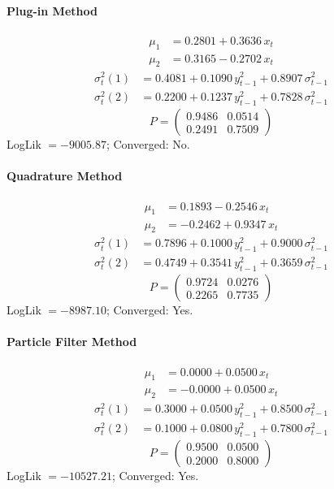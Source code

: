 \documentclass[11pt, a4paper]{article}
\begin{document}
\paragraph{Plug-in Method}
\begin{align}
\mu_{1} &= 0.2801 + 0.3636\, x_t \\
\mu_{2} &= 0.3165 -0.2702\, x_t
\end{align}
\begin{align}
\sigma^2_{t}(1) &= 0.4081 + 0.1090\, y_{t-1}^2 + 0.8907\, \sigma^2_{t-1} \\
\sigma^2_{t}(2) &= 0.2200 + 0.1237\, y_{t-1}^2 + 0.7828\, \sigma^2_{t-1}
\end{align}
\begin{equation}
P = \begin{pmatrix} 0.9486 & 0.0514 \\ 0.2491 & 0.7509 \end{pmatrix}
\end{equation}
LogLik $= -9005.87$; Converged: No.

\paragraph{Quadrature Method}
\begin{align}
\mu_{1} &= 0.1893 -0.2546\, x_t \\
\mu_{2} &= -0.2462 + 0.9347\, x_t
\end{align}
\begin{align}
\sigma^2_{t}(1) &= 0.7896 + 0.1000\, y_{t-1}^2 + 0.9000\, \sigma^2_{t-1} \\
\sigma^2_{t}(2) &= 0.4749 + 0.3541\, y_{t-1}^2 + 0.3659\, \sigma^2_{t-1}
\end{align}
\begin{equation}
P = \begin{pmatrix} 0.9724 & 0.0276 \\ 0.2265 & 0.7735 \end{pmatrix}
\end{equation}
LogLik $= -8987.10$; Converged: Yes.

\paragraph{Particle Filter Method}
\begin{align}
\mu_{1} &= 0.0000 + 0.0500\, x_t \\
\mu_{2} &= -0.0000 + 0.0500\, x_t
\end{align}
\begin{align}
\sigma^2_{t}(1) &= 0.3000 + 0.0500\, y_{t-1}^2 + 0.8500\, \sigma^2_{t-1} \\
\sigma^2_{t}(2) &= 0.1000 + 0.0800\, y_{t-1}^2 + 0.7800\, \sigma^2_{t-1}
\end{align}
\begin{equation}
P = \begin{pmatrix} 0.9500 & 0.0500 \\ 0.2000 & 0.8000 \end{pmatrix}
\end{equation}
LogLik $= -10527.21$; Converged: Yes.
\end{document}
